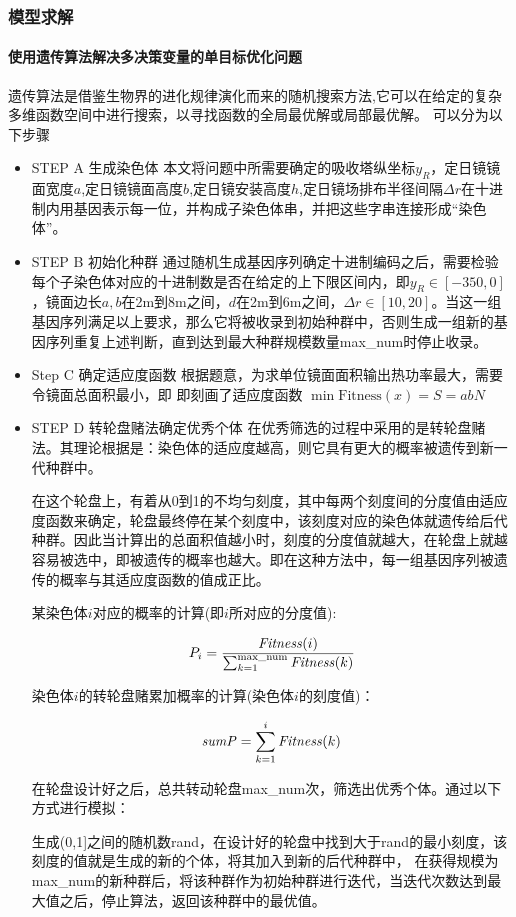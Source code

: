 \subsubsection{模型求解}
\paragraph{使用遗传算法解决多决策变量的单目标优化问题}
遗传算法是借鉴生物界的进化规律演化而来的随机搜索方法,它可以在给定的复杂多维函数空间中进行搜索，以寻找函数的全局最优解或局部最优解。
可以分为以下步骤
\begin{itemize}
\item STEP A 生成染色体
本文将问题中所需要确定的吸收塔纵坐标\(y_{R}\)，定日镜镜面宽度\(a\),定日镜镜面高度\(b\),定日镜安装高度\(h\),定日镜场排布半径间隔\(\Delta r\)在十进制内用基因表示每一位，并构成子染色体串，并把这些字串连接形成“染色体”。
\item 
STEP B    初始化种群
通过随机生成基因序列确定十进制编码之后，需要检验每个子染色体对应的十进制数是否在给定的上下限区间内，即\(y_{R} \in [-350 ,0]\)，镜面边长\(a, b\)在2m到8m之间，\(d\)在2m到6m之间，\(\Delta r \in [10, 20]\)。当这一组基因序列满足以上要求，那么它将被收录到初始种群中，否则生成一组新的基因序列重复上述判断，直到达到最大种群规模数量max\_num时停止收录。
\item 
Step C   确定适应度函数
根据题意，为求单位镜面面积输出热功率最大，需要令镜面总面积最小，即
即刻画了适应度函数 \(\min \mathrm{Fitness}(x) = S = a  b  N\)
\item 
STEP D   转轮盘赌法确定优秀个体
在优秀筛选的过程中采用的是转轮盘赌法。其理论根据是：染色体的适应度越高，则它具有更大的概率被遗传到新一代种群中。
	
在这个轮盘上，有着从0到1的不均匀刻度，其中每两个刻度间的分度值由适应度函数来确定，轮盘最终停在某个刻度中，该刻度对应的染色体就遗传给后代种群。因此当计算出的总面积值越小时，刻度的分度值就越大，在轮盘上就越容易被选中，即被遗传的概率也越大。即在这种方法中，每一组基因序列被遗传的概率与其适应度函数的值成正比。
	
某染色体\(i\)对应的概率的计算(即\(i\)所对应的分度值):

\begin{equation}
P_{i} = \frac{{\it Fitness}(i)}{\sum_{k=1} ^{\text{max\_num}} {\it Fitness} (k)}
\end{equation}
	
染色体\(i\)的转轮盘赌累加概率的计算(染色体\(i\)的刻度值)：

\begin{equation}
{\it sum P} = \sum_{k=1} ^{i} {\it Fitness} (k)
\end{equation}

在轮盘设计好之后，总共转动轮盘max\_num次，筛选出优秀个体。通过以下方式进行模拟：

生成(0,1]之间的随机数rand，在设计好的轮盘中找到大于rand的最小刻度，该刻度的值就是生成的新的个体，将其加入到新的后代种群中，
在获得规模为max\_num的新种群后，将该种群作为初始种群进行迭代，当迭代次数达到最大值之后，停止算法，返回该种群中的最优值。
\end{itemize}

